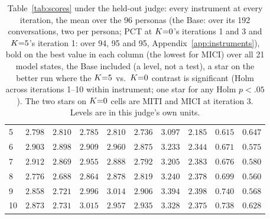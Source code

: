\begin{table}[t]
\begin{tabular}{@{}lrrrrrrrrr@{}}
5 & $2.798$\rlap{$^{*}$} & $2.810$\rlap{$^{*}$} & $2.785$ & $2.810$ & $2.736$ & $3.097$\rlap{$^{*}$} & $2.185$ & $0.615$\rlap{$^{*}$} & $0.647$\\
6 & $2.903$\rlap{$^{*}$} & $\mathbf{2.898}$\rlap{$^{*}$} & $2.909$\rlap{$^{*}$} & $2.960$\rlap{$^{*}$} & $2.875$\rlap{$^{*}$} & $3.233$\rlap{$^{*}$} & $2.344$\rlap{$^{*}$} & $0.671$\rlap{$^{*}$} & $0.575$\\
7 & $\mathbf{2.912}$\rlap{$^{*}$} & $2.869$\rlap{$^{*}$} & $2.955$ & $2.888$ & $2.792$\rlap{$^{*}$} & $3.205$\rlap{$^{*}$} & $2.383$\rlap{$^{*}$} & $0.676$\rlap{$^{*}$} & $0.580$\\
8 & $2.776$\rlap{$^{*}$} & $2.688$\rlap{$^{*}$} & $2.864$ & $2.878$ & $2.819$ & $3.240$\rlap{$^{*}$} & $2.378$ & $0.699$\rlap{$^{*}$} & $0.560$\rlap{$^{*}$}\\
9 & $2.858$\rlap{$^{*}$} & $2.721$\rlap{$^{*}$} & $2.996$\rlap{$^{*}$} & $\mathbf{3.014}$\rlap{$^{*}$} & $2.906$\rlap{$^{*}$} & $\mathbf{3.394}$\rlap{$^{*}$} & $\mathbf{2.398}$\rlap{$^{*}$} & $\mathbf{0.740}$\rlap{$^{*}$} & $0.568$\rlap{$^{*}$}\\
10 & $2.873$\rlap{$^{*}$} & $2.731$\rlap{$^{*}$} & $\mathbf{3.015}$\rlap{$^{*}$} & $2.957$\rlap{$^{*}$} & $\mathbf{2.935}$\rlap{$^{*}$} & $3.328$\rlap{$^{*}$} & $2.375$\rlap{$^{*}$} & $0.738$\rlap{$^{*}$} & $0.628$\rlap{$^{*}$}\\
\bottomrule
\end{tabular}
\caption{Table~\ref{tab:scores} under the held-out judge: every instrument at every iteration, the
mean over the 96 personas (the Base: over its 192 conversations, two per persona; PCT at $K{=}0$'s
iterations 1 and 3 and $K{=}5$'s iteration 1: over 94, 95 and 95, Appendix~\ref{app:instruments}),
bold on the best
value in each column (the lowest for MICI) over all 21 model states, the Base included (a level, not
a test), a star on the better run where the $K{=}5$ vs.\ $K{=}0$ contrast is significant (Holm across
iterations 1--10 within instrument; one star for any Holm $p<.05$). The two stars on $K{=}0$ cells
are MITI and MICI at iteration 3. Levels are in this judge's own units.}
\label{tab:scores-heldout}
\end{table}

